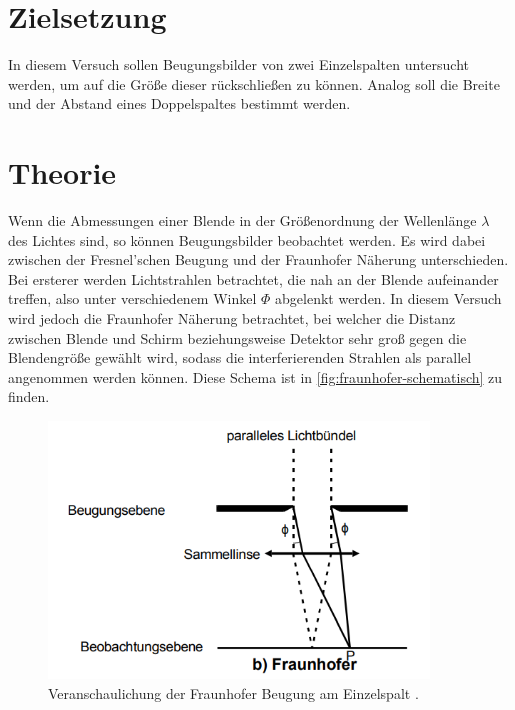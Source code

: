 \section{Zielsetzung}

In diesem Versuch sollen Beugungsbilder von zwei Einzelspalten untersucht werden, um auf die Größe dieser rückschließen zu können.
Analog soll die Breite und der Abstand eines Doppelspaltes bestimmt werden.


\section{Theorie}
\label{sec:Theorie}

Wenn die Abmessungen einer Blende in der Größenordnung der Wellenlänge $\lambda$ des Lichtes sind, so können Beugungsbilder beobachtet werden.
Es wird dabei zwischen der Fresnel'schen Beugung und der Fraunhofer Näherung unterschieden.
Bei ersterer werden Lichtstrahlen betrachtet, die nah an der Blende aufeinander treffen, also unter verschiedenem Winkel $\Phi$ abgelenkt werden.
In diesem Versuch wird jedoch die Fraunhofer Näherung betrachtet, bei welcher die Distanz zwischen Blende und Schirm beziehungsweise Detektor sehr groß gegen die Blendengröße gewählt wird,
sodass die interferierenden Strahlen als parallel angenommen werden können. Diese Schema ist in \autoref{fig:fraunhofer-schematisch} zu finden.

\begin{figure}
    \centering
    \includegraphics[width=0.9\textwidth]{content/fraunhofer-schematisch.png}
    \caption{Veranschaulichung der Fraunhofer Beugung am Einzelspalt \cite{V406}.}
    \label{fig:fraunhofer-schematisch}
\end{figure}

